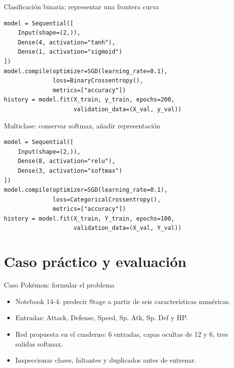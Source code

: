 \documentclass[10pt,aspectratio=169,xcolor={dvipsnames}]{beamer}
\begin{document}
\begin{frame}[fragile]{Clasificación binaria: representar una frontera curva}
\begin{lstlisting}
model = Sequential([
    Input(shape=(2,)),
    Dense(4, activation="tanh"),
    Dense(1, activation="sigmoid")
])
model.compile(optimizer=SGD(learning_rate=0.1),
              loss=BinaryCrossentropy(),
              metrics=["accuracy"])
history = model.fit(X_train, y_train, epochs=200,
                    validation_data=(X_val, y_val))
\end{lstlisting}

\end{frame}

\begin{frame}[fragile]{Multiclase: conservar softmax, añadir representación}
\begin{lstlisting}
model = Sequential([
    Input(shape=(2,)),
    Dense(8, activation="relu"),
    Dense(3, activation="softmax")
])
model.compile(optimizer=SGD(learning_rate=0.1),
              loss=CategoricalCrossentropy(),
              metrics=["accuracy"])
history = model.fit(X_train, Y_train, epochs=100,
                    validation_data=(X_val, Y_val))
\end{lstlisting}

\end{frame}

\section{Caso práctico y evaluación}
\begin{frame}{Caso Pokémon: formular el problema}
\begin{itemize}
\item Notebook 14-4: predecir Stage a partir de seis características numéricas.
\item Entradas: Attack, Defense, Speed, Sp. Atk, Sp. Def y HP.
\item Red propuesta en el cuaderno: 6 entradas, capas ocultas de 12 y 6, tres salidas softmax.
\item Inspeccionar clases, faltantes y duplicados antes de entrenar.
\end{itemize}
\end{frame}
\end{document}
